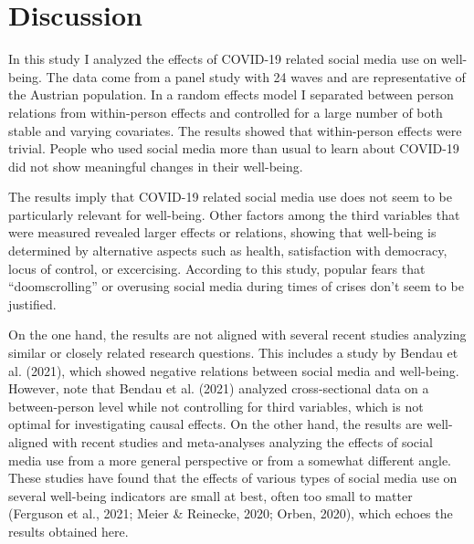 \documentclass[
  english,
  man,mask,floatsintext]{apa6}
\begin{document}
\hypertarget{discussion}{%
\section{Discussion}\label{discussion}}

In this study I analyzed the effects of COVID-19 related social media use on well-being.
The data come from a panel study with 24 waves and are representative of the Austrian population.
In a random effects model I separated between person relations from within-person effects and controlled for a large number of both stable and varying covariates.
The results showed that within-person effects were trivial.
People who used social media more than usual to learn about COVID-19 did not show meaningful changes in their well-being.

The results imply that COVID-19 related social media use does not seem to be particularly relevant for well-being.
Other factors among the third variables that were measured revealed larger effects or relations, showing that well-being is determined by alternative aspects such as health, satisfaction with democracy, locus of control, or excercising.
According to this study, popular fears that ``doomscrolling'' or overusing social media during times of crises don't seem to be justified.

On the one hand, the results are not aligned with several recent studies analyzing similar or closely related research questions.
This includes a study by Bendau et al. (2021), which showed negative relations between social media and well-being.
However, note that Bendau et al. (2021) analyzed cross-sectional data on a between-person level while not controlling for third variables, which is not optimal for investigating causal effects.
On the other hand, the results are well-aligned with recent studies and meta-analyses analyzing the effects of social media use from a more general perspective or from a somewhat different angle.
These studies have found that the effects of various types of social media use on several well-being indicators are small at best, often too small to matter (Ferguson et al., 2021; Meier \& Reinecke, 2020; Orben, 2020), which echoes the results obtained here.
\end{document}
